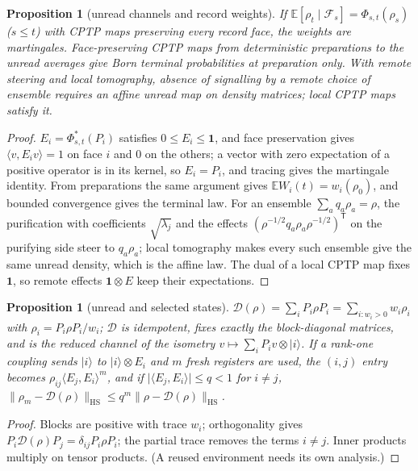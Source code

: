 \documentclass[aps,pra,onecolumn,superscriptaddress,nofootinbib,10pt]{revtex4-2}
\newtheorem{proposition}[theorem]{Proposition}
\theoremstyle{definition}
\theoremstyle{remark}
\newcommand{\ip}[2]{\langle #1,#2\rangle}
\begin{document}
\begin{proposition}[unread channels and record weights]\label{prop:sochannels}
If $\mathbb E[\rho_t\mid\mathcal F_s]=\Phi_{s,t}(\rho_s)$ ($s\le t$) with CPTP maps preserving every record face, the weights are martingales.
Face-preserving CPTP maps from deterministic preparations to the unread averages give Born terminal
probabilities at preparation only.  With remote steering and local tomography, absence of signalling by
a remote choice of ensemble requires an affine unread map on density matrices; local CPTP maps satisfy
it.
\end{proposition}
\begin{proof}
$E_i=\Phi^*_{s,t}(P_i)$ satisfies $0\le E_i\le\mathbf1$, and face preservation gives $\ip v{E_iv}=1$ on face $i$ and $0$ on the others;
a vector with zero expectation of a positive operator is in its kernel, so $E_i=P_i$, and tracing gives the
martingale identity.  From preparations the same argument gives $\mathbb EW_i(t)=w_i(\rho_0)$, and bounded convergence
gives the terminal law.  For an ensemble $\sum_aq_a\rho_a=\rho$, the purification with coefficients $\sqrt{\lambda_j}$ and the
effects $(\rho^{-1/2}q_a\rho_a\rho^{-1/2})^{\mathsf T}$ on the purifying side steer to $q_a\rho_a$; local tomography makes every such
ensemble give the same unread density, which is the affine law.  The dual of a local CPTP map fixes $\mathbf1$, so
remote effects $\mathbf1\otimes E$ keep their expectations.
\end{proof}

\begin{proposition}[unread and selected states]\label{prop:sopinching}
$\mathcal D(\rho)=\sum_iP_i\rho P_i=\sum_{i:w_i>0}w_i\rho_i$ with $\rho_i=P_i\rho P_i/w_i$; $\mathcal D$ is idempotent, fixes exactly the block-diagonal
matrices, and is the reduced channel of the isometry $v\mapsto\sum_iP_iv\otimes\lvert i\rangle$.  If a rank-one coupling sends $\lvert i\rangle$
to $\lvert i\rangle\otimes E_i$ and $m$ fresh registers are used, the $(i,j)$ entry becomes $\rho_{ij}\ip{E_j}{E_i}^m$, and if $\lvert\ip{E_j}{E_i}\rvert\le q<1$ for
$i\ne j$, $\lVert\rho_m-\mathcal D(\rho)\rVert_{\mathrm{HS}}\le q^m\lVert\rho-\mathcal D(\rho)\rVert_{\mathrm{HS}}$.
\end{proposition}
\begin{proof}
Blocks are positive with trace $w_i$; orthogonality gives $P_i\mathcal D(\rho)P_j=\delta_{ij}P_i\rho P_i$; the partial trace removes the terms
$i\ne j$.  Inner products multiply on tensor products.  (A reused environment needs its own analysis.)
\end{proof}
\end{document}
